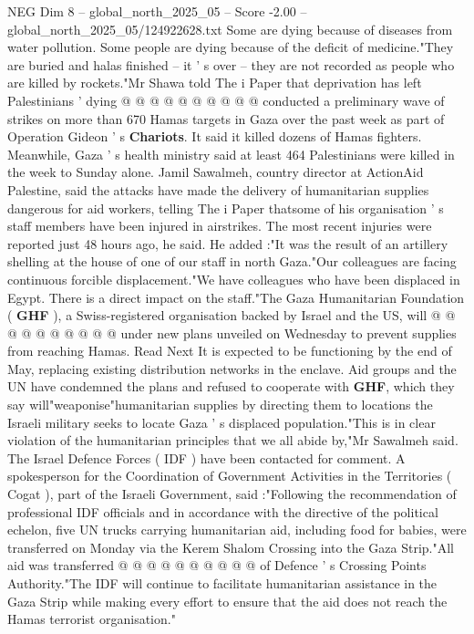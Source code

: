 \begin{textsample}{NEG Dim 8 – global\_north\_2025\_05 – Score -2.00 – global\_north\_2025\_05/124922628.txt}
Some are dying because of diseases from water pollution.
Some people are dying because of the deficit of medicine."They are buried and halas finished -- it ' s over -- they are not recorded as people who are killed by rockets."Mr Shawa told The i Paper that deprivation has left Palestinians ' dying @ @ @ @ @ @ @ @ @ @ conducted a preliminary wave of strikes on more than 670 Hamas targets in Gaza over the past week as part of Operation Gideon ' s \textbf{Chariots}.
It said it killed dozens of Hamas fighters.
Meanwhile, Gaza ' s health ministry said at least 464 Palestinians were killed in the week to Sunday alone.
Jamil Sawalmeh, country director at ActionAid Palestine, said the attacks have made the delivery of humanitarian supplies dangerous for aid workers, telling The i Paper thatsome of his organisation ' s staff members have been injured in airstrikes.
The most recent injuries were reported just 48 hours ago, he said.
He added :"It was the result of an artillery shelling at the house of one of our staff in north Gaza."Our colleagues are facing continuous forcible displacement."We have colleagues who have been displaced in Egypt.
There is a direct impact on the staff."The Gaza Humanitarian Foundation ( \textbf{GHF} ), a Swiss-registered organisation backed by Israel and the US, will @ @ @ @ @ @ @ @ @ @ under new plans unveiled on Wednesday to prevent supplies from reaching Hamas.
Read Next It is expected to be functioning by the end of May, replacing existing distribution networks in the enclave.
Aid groups and the UN have condemned the plans and refused to cooperate with \textbf{GHF}, which they say will"weaponise"humanitarian supplies by directing them to locations the Israeli military seeks to locate Gaza ' s displaced population."This is in clear violation of the humanitarian principles that we all abide by,"Mr Sawalmeh said.
The Israel Defence Forces ( IDF ) have been contacted for comment.
A spokesperson for the Coordination of Government Activities in the Territories ( Cogat ), part of the Israeli Government, said :"Following the recommendation of professional IDF officials and in accordance with the directive of the political echelon, five UN trucks carrying humanitarian aid, including food for babies, were transferred on Monday via the Kerem Shalom Crossing into the Gaza Strip."All aid was transferred @ @ @ @ @ @ @ @ @ @ of Defence ' s Crossing Points Authority."The IDF will continue to facilitate humanitarian assistance in the Gaza Strip while making every effort to ensure that the aid does not reach the Hamas terrorist organisation."

\end{textsample}
